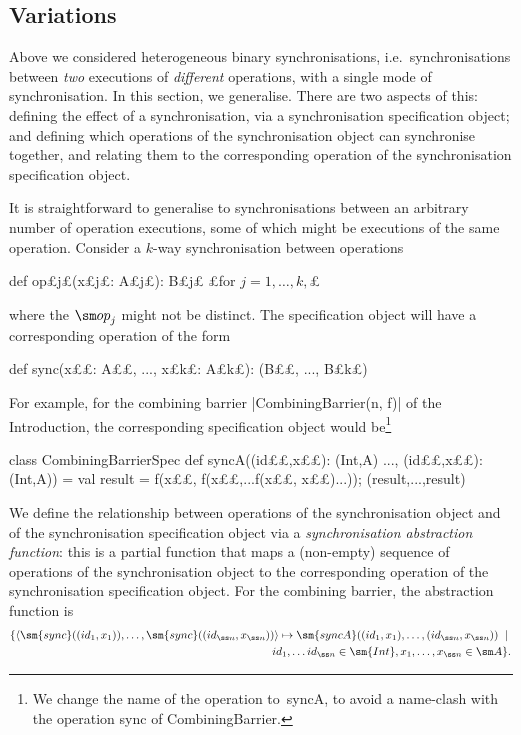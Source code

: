 \subsection{Variations}
\label{ssec:spec-variations}

Above we considered heterogeneous binary synchronisations,
i.e.~synchronisations between \emph{two} executions of \emph{different}
operations, with a single mode of synchronisation.  In this section, we
generalise.  There are two aspects of this: defining the effect of a
synchronisation, via a synchronisation specification object; and defining
which operations of the synchronisation object can synchronise together, and
relating them to the corresponding operation of the synchronisation
specification object.

It is straightforward to generalise to synchronisations between an arbitrary
number of operation executions, some of which might be executions of the same
operation.  Consider a $k$-way synchronisation between operations
\begin{scala}
def op£\s j£(x£\s j£: A£\s j£): B£\s j£   £for $j = 1, \ldots, k,$£
\end{scala}
%
where the $\op_j$ might not be distinct.
The specification object will have a corresponding operation of the form
%
\begin{scala} 
def sync(x££: A££, ..., x£\s k£: A£\s k£): (B££, ..., B£\s k£)
\end{scala}
%
For example, for the combining barrier |CombiningBarrier(n, f)| of the
Introduction, the corresponding specification object would be\footnote{We
  change the name of the operation to~{\scalashape syncA}, to avoid a
  name-clash with the operation {\scalashape sync} of {\scalashape
    CombiningBarrier}.}   
\begin{scala}
class CombiningBarrierSpec{
  def syncA((id££,x££): (Int,A) ..., (id££,x££): (Int,A)) = {
    val result = f(x££, f(x££,...f(x££, x££)...)); (result,...,result)
  }
}
\end{scala}

We define the relationship between operations of the synchronisation object
and of the synchronisation specification object via a \emph{synchronisation
  abstraction function}: this is a partial function that maps a (non-empty)
sequence of operations of the synchronisation object to the corresponding
operation of the synchronisation specification object.  For the combining
barrier, the abstraction function is
\[
\begin{align}
\set{ 
  \seq{ \sm{sync}((id_1,x_1)), \ldots, \sm{sync}((id_{\ss n},x_{\ss n})) } \mapsto
  \sm{syncA}((id_1,x_1), \ldots, (id_{\ss n},x_{\ss n})) 
 \midd \\
\qquad id_1, \ldots id_{\ss n} \in \sm{Int}, x_1,\ldots,x_{\ss n} \in \sm A
}.
\end{align}
\]

